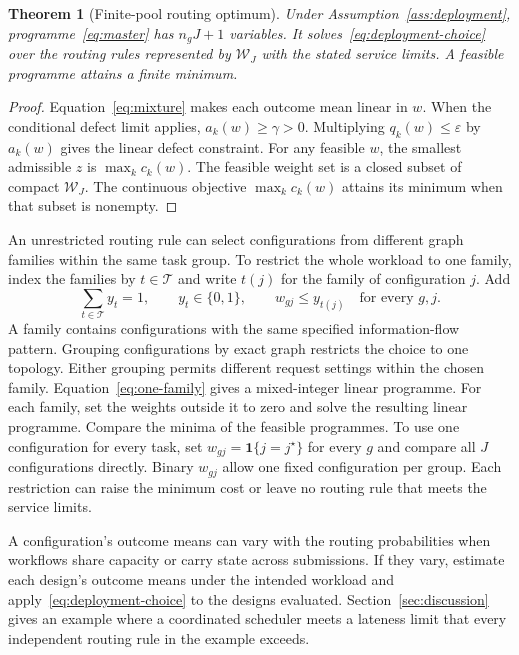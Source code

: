 \documentclass[11pt,reqno]{amsart}
\newtheorem{theorem}{Theorem}[section]
\theoremstyle{definition}
\theoremstyle{remark}
\begin{document}
\begin{theorem}[Finite-pool routing optimum]\label{thm:master}
Under Assumption~\ref{ass:deployment}, programme~\eqref{eq:master} has \(n_gJ+1\) variables. It solves~\eqref{eq:deployment-choice} over the routing rules represented by \(\mathcal W_J\) with the stated service limits. A feasible programme attains a finite minimum.
\end{theorem}
\begin{proof}
Equation~\eqref{eq:mixture} makes each outcome mean linear in \(w\). When the conditional defect limit applies, \(a_k(w)\ge\gamma>0\). Multiplying \(q_k(w)\le\varepsilon\) by \(a_k(w)\) gives the linear defect constraint. For any feasible \(w\), the smallest admissible \(z\) is \(\max_kc_k(w)\). The feasible weight set is a closed subset of compact \(\mathcal W_J\). The continuous objective \(\max_kc_k(w)\) attains its minimum when that subset is nonempty.
\end{proof}

An unrestricted routing rule can select configurations from different graph families within the same task group. To restrict the whole workload to one family, index the families by \(t\in\mathcal T\) and write \(t(j)\) for the family of configuration \(j\). Add
\begin{equation}
 \sum_{t\in\mathcal T}y_t=1,\qquad y_t\in\{0,1\},\qquad
 w_{gj}\le y_{t(j)}\quad\text{for every }g,j.
 \label{eq:one-family}
\end{equation}
A family contains configurations with the same specified information-flow pattern. Grouping configurations by exact graph restricts the choice to one topology. Either grouping permits different request settings within the chosen family. Equation~\eqref{eq:one-family} gives a mixed-integer linear programme. For each family, set the weights outside it to zero and solve the resulting linear programme. Compare the minima of the feasible programmes. To use one configuration for every task, set \(w_{gj}=\mathbf1\{j=j^\star\}\) for every \(g\) and compare all \(J\) configurations directly. Binary \(w_{gj}\) allow one fixed configuration per group. Each restriction can raise the minimum cost or leave no routing rule that meets the service limits.

A configuration's outcome means can vary with the routing probabilities when workflows share capacity or carry state across submissions. If they vary, estimate each design's outcome means under the intended workload and apply~\eqref{eq:deployment-choice} to the designs evaluated. Section~\ref{sec:discussion} gives an example where a coordinated scheduler meets a lateness limit that every independent routing rule in the example exceeds.
\end{document}
